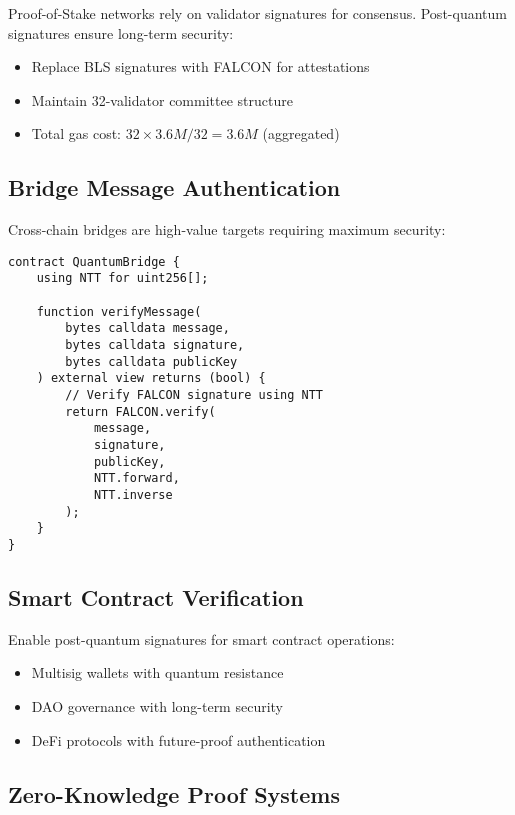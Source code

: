 \documentclass[11pt,a4paper]{article}
\begin{document}
Proof-of-Stake networks rely on validator signatures for consensus. Post-quantum signatures ensure long-term security:

\begin{itemize}
\item Replace BLS signatures with FALCON for attestations
\item Maintain 32-validator committee structure
\item Total gas cost: $32 \times 3.6M / 32 = 3.6M$ (aggregated)
\end{itemize}

\subsection{Bridge Message Authentication}

Cross-chain bridges are high-value targets requiring maximum security:

\begin{lstlisting}[caption={Bridge Message Verification}]
contract QuantumBridge {
    using NTT for uint256[];

    function verifyMessage(
        bytes calldata message,
        bytes calldata signature,
        bytes calldata publicKey
    ) external view returns (bool) {
        // Verify FALCON signature using NTT
        return FALCON.verify(
            message,
            signature,
            publicKey,
            NTT.forward,
            NTT.inverse
        );
    }
}
\end{lstlisting}

\subsection{Smart Contract Verification}

Enable post-quantum signatures for smart contract operations:

\begin{itemize}
\item Multisig wallets with quantum resistance
\item DAO governance with long-term security
\item DeFi protocols with future-proof authentication
\end{itemize}

\subsection{Zero-Knowledge Proof Systems}
\end{document}
